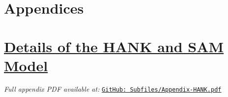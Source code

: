 \documentclass[titlepage, headings=optiontotocandhead]{econark} %
\begin{document}

\pagebreak



\pagebreak



\clearpage

\section*{Appendices}

\appendix




\FloatBarrier
{}
\section{\href{https://econ-ark.github.io/HAFiscal/\#sec:appendix-hank}{Details of the HANK and SAM Model}}
\label{sec:appendix-hank}

\noindent\textit{Full appendix PDF available at:}
\href{https://github.com/econ-ark/HAFiscal/blob/master/Subfiles/Appendix-HANK.pdf}{\texttt{GitHub: Subfiles/Appendix-HANK.pdf}}
\end{document}
